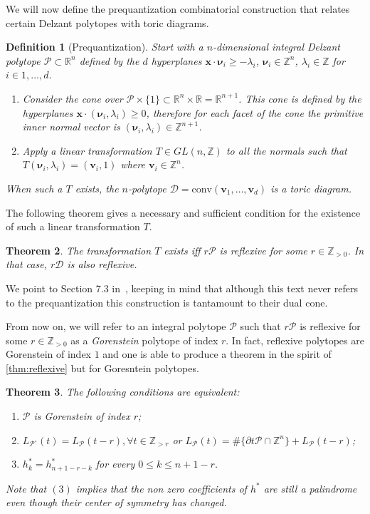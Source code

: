 \documentclass[a4paper,11pt,reqno]{amsart}
\newcommand{\R}{\mathbb R}
\newcommand{\Z}{\mathbb Z}
\newtheorem{theorem}{Theorem}[section]
\newtheorem{definition}[theorem]{Definition}
\begin{document}
We will now define the prequantization combinatorial construction that relates certain Delzant polytopes with toric diagrams.
\begin{definition}[Prequantization]\label{def:preq}
Start with a $n$-dimensional integral Delzant polytope $\mathcal{P} \subset \mathbb{R}^n$ defined by the $d$ hyperplanes 
$\bm{x} \cdot \bm{\nu}_i \geq -\lambda_i$, $\bm{\nu}_i \in \mathbb{Z}^n$, $\lambda_i \in \mathbb{Z}$ for $i \in 1, \dots, d$.
\begin{enumerate}
\item Consider the cone over $\mathcal{P} \times \{1\} \subset \R^n \times \R = \R^{n+1}$. This cone is defined by the hyperplanes 
$\bm{x} \cdot (\bm{\nu}_i , \lambda_i)\geq 0$, therefore for each facet of the cone the primitive inner normal vector is 
$(\bm{\nu}_i , \lambda_i) \in \mathbb{Z}^{n+1}$.
\item Apply a linear transformation $T\in GL(n, \Z)$ to all the normals such that $ T(\bm{\nu}_i, \lambda_i) = (\bm{v}_i, 1)$ where 
$\bm{v}_i \in \mathbb{Z}^{n}$.
\end{enumerate}
When such a $T$ exists, the $n$-polytope $\mathcal{D}=\text{conv}(\bm{v}_1, \dots, \bm{v}_{d})$ is a toric diagram. 
\end{definition}
\noindent The following theorem gives a necessary and sufficient condition for the existence of such a linear transformation $T$.
\begin{theorem}\label{thm:preq_are_gorenstein}
The transformation $T$ exists iff $r \mathcal{P}$ is reflexive for some $r \in \mathbb{Z}_{>0}$. In that case, 
$r \mathcal{D}$ is also reflexive.
\end{theorem}
\noindent We point to Section 7.3 in~\cite{HNP}, keeping in mind that although this text never refers to the prequantization this 
construction is tantamount to their dual cone.

From now on, we will refer to an integral polytope $\mathcal{P}$ such that $r\mathcal{P}$ is reflexive for some 
$r \in \mathbb{Z}_{>0}$ as a \emph{Gorenstein} polytope of index $r$. In fact, reflexive polytopes are Gorenstein of index 
$1$ and one is able to produce a theorem in the spirit of \autoref{thm:reflexive} but for Goresntein polytopes.
\begin{theorem}\label{thm:gorenstein}
The following conditions are equivalent:
\begin{enumerate}
\item $\mathcal{P}$ is Gorenstein of index $r$;
\item $L_{\mathcal{P}^\circ} (t) = L_{\mathcal{P}} (t-r), \forall t \in \mathbb{Z}_{>r}$ or 
$L_{\mathcal{P}} (t)= \#\{ \partial t \mathcal{P} \cap \mathbb{Z}^n \} + L_{\mathcal{P}} (t-r)$;
\item $h_k^*=h^*_{n+1-r-k}$ for every $0 \leq k \leq n+1-r$.
\end{enumerate}
\noindent Note that $(3)$ implies that the non zero coefficients of $h^*$ are still a palindrome even though their center of 
symmetry has changed.
\end{theorem}
\end{document}
